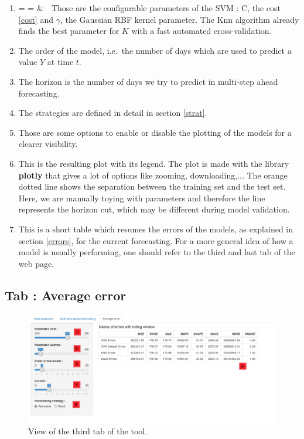 \documentclass[11pt,a4paper,oneside]{book}
\makeatletter
\newcommand{\inlineitem}[1][]{%
\ifnum\enit@type=\tw@
    {\descriptionlabel{#1}}
  \hspace{\labelsep}
\else
  \ifnum\enit@type=\z@
       \refstepcounter{\@listctr}\fi
    \&\ \@itemlabel\ 
\fi}
\makeatother
\begin{document}
\begin{enumerate}
\item\inlineitem Those are the configurable parameters of the SVM : C, the cost \ref{cost} and $\gamma$, the Gaussian RBF kernel parameter. The Knn algorithm already finds the best parameter for $K$ with a fast automated cross-validation.
\item The order of the model, i.e.\ the number of days which are used to predict a value $Y$ at time $t$.
\item The horizon is the number of days we try to predict in multi-step ahead forecasting.
\item The strategies are defined in detail in section \ref{strat}.
\item Those are some options to enable or disable the plotting of the models for a clearer visibility.
\item This is the resulting plot with its legend. The plot is made with the library \textbf{plotly} that gives a lot of options like zooming, downloading,... The orange dotted line shows the separation between the training set and the test set. Here, we are manually toying with parameters and therefore the line represents the horizon cut, which may be different during model validation.
\item This is a short table which resumes the errors of the models, as explained in section \ref{errors}, for the current forecasting. For a more general idea of how a model is usually performing, one should refer to the third and last tab of the web page. 
\end{enumerate}



\subsection{Tab : Average error}

\begin{figure}[!h]
  \centering
    \includegraphics[scale=0.44]{img/tab3.png}
  \caption{View of the third tab of the tool.}
  \label{fig:tool3}
\end{figure}
\end{document}
